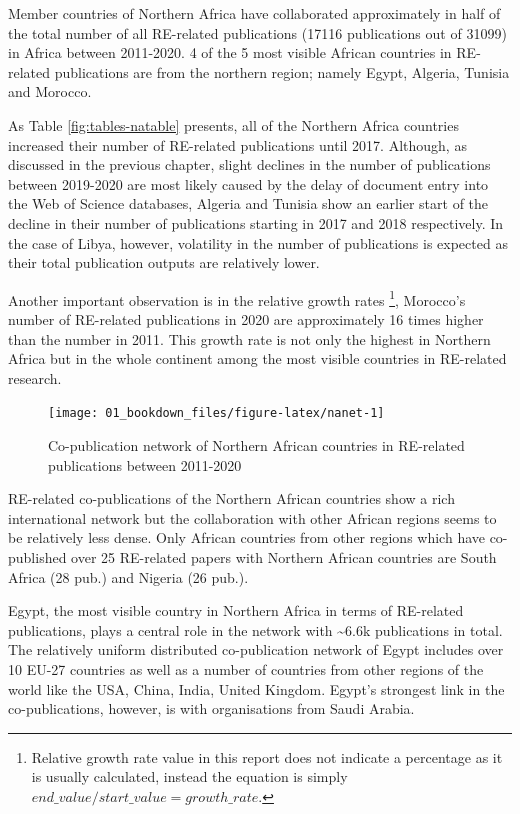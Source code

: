 \documentclass[
]{book}
\begin{document}
Member countries of Northern Africa have collaborated approximately in half of
the total number of all RE-related publications (17116 publications out of 31099) in Africa between 2011-2020. 4 of the 5 most visible African countries in RE-related publications are from the
northern region; namely Egypt, Algeria, Tunisia and Morocco.

As Table \ref{fig:tables-natable}
presents, all of the Northern Africa countries increased their number of RE-related
publications until 2017. Although, as discussed in the previous chapter, slight declines in the number of publications between 2019-2020 are most likely caused by the delay of document entry into the Web of Science databases, Algeria and Tunisia show an earlier start of
the decline in their number of publications starting in 2017 and 2018 respectively. In the
case of Libya, however, volatility in the number of publications
is expected as their total publication outputs are relatively lower.

Another important observation is in the relative growth rates \footnote{Relative growth rate value in this report does not indicate a percentage as
  it is usually calculated, instead the equation is simply \(end\_value/start\_value = growth\_rate\).}, Morocco's number of
RE-related publications in 2020 are approximately 16 times higher than the number in 2011.
This growth rate is not only the highest in Northern Africa but in the whole continent among the most visible countries in RE-related research.

\begin{figure}
\texttt{[image: 01\_bookdown\_files/figure-latex/nanet-1]} \caption{Co-publication network of Northern African countries in RE-related publications between 2011-2020}\label{fig:nanet}
\end{figure}

RE-related co-publications of the Northern African countries show a rich international network but the collaboration with other African regions seems to be relatively less dense. Only African countries from other regions which have co-published over 25 RE-related papers with Northern African countries are South Africa (28 pub.) and Nigeria (26 pub.).

Egypt, the most visible country in Northern Africa in terms of RE-related publications, plays a central role in the network with \textasciitilde6.6k publications in total. The relatively uniform distributed co-publication network of Egypt includes over 10 EU-27 countries as well as a number of countries from other regions of the world like the USA, China, India, United Kingdom. Egypt's strongest link in the co-publications, however, is with organisations from Saudi Arabia.
\end{document}
